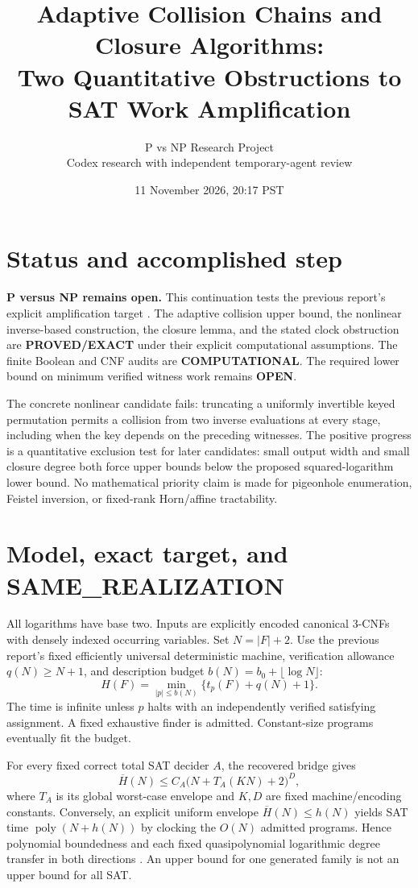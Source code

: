 \documentclass[11pt]{article}
\title{Adaptive Collision Chains and Closure Algorithms:\\
Two Quantitative Obstructions to SAT Work Amplification}
\author{P vs NP Research Project\\Codex research with independent temporary-agent review}
\date{11 November 2026, 20:17 PST}
\newcommand{\poly}{\operatorname{poly}}
\begin{document}
\maketitle

\section*{Status and accomplished step}
\textbf{P versus NP remains open.}
This continuation tests the previous report's explicit amplification target
\cite{transfer2026}. The adaptive collision upper bound, the nonlinear
inverse-based construction, the closure lemma, and the stated clock obstruction
are \textbf{PROVED/EXACT} under their explicit computational assumptions.
The finite Boolean and CNF audits are \textbf{COMPUTATIONAL}.
The required lower bound on minimum verified witness work remains \textbf{OPEN}.

The concrete nonlinear candidate fails: truncating a uniformly invertible
keyed permutation permits a collision from two inverse evaluations at every
stage, including when the key depends on the preceding witnesses.
The positive progress is a quantitative exclusion test for later candidates:
small output width and small closure degree both force upper bounds below
the proposed squared-logarithm lower bound. No mathematical priority claim
is made for pigeonhole enumeration, Feistel inversion, or fixed-rank
Horn/affine tractability.

\section*{Model, exact target, and SAME\_REALIZATION}
All logarithms have base two. Inputs are explicitly encoded canonical
3-CNFs with densely indexed occurring variables. Set $N=|F|+2$.
Use the previous report's fixed efficiently universal deterministic machine,
verification allowance $q(N)\ge N+1$, and description budget
$b(N)=b_0+\lfloor\log N\rfloor$:
\[
 H(F)=\min_{|p|\le b(N)}\{t_p(F)+q(N)+1\}.
 \tag{1}
\]
The time is infinite unless $p$ halts with an independently verified
satisfying assignment. A fixed exhaustive finder is admitted.
Constant-size programs eventually fit the budget.

For every fixed correct total SAT decider $A$, the recovered bridge gives
\[
 \overline H(N)\le C_A\bigl(N+T_A(KN)+2\bigr)^D,
 \tag{2}
\]
where $T_A$ is its global worst-case envelope and $K,D$ are fixed
machine/encoding constants. Conversely, an explicit uniform envelope
$\overline H(N)\le h(N)$ yields SAT time $\poly(N+h(N))$ by clocking
the $O(N)$ admitted programs. Hence polynomial boundedness and each fixed
quasipolynomial logarithmic degree transfer in both directions
\cite{transfer2026}. An upper bound for one generated family is not an
upper bound for all SAT.
\end{document}
